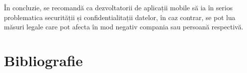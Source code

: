 \documentclass[12pt]{article}
\begin{document}
\bigskip

În concluzie, se recomandă ca dezvoltatorii de aplicații mobile să ia în serios
problematica securității și confidentialitații datelor, în caz contrar, se pot
lua măsuri legale care pot afecta în mod negativ compania sau persoană respectivă.

\newpage
\section{Bibliografie}
\nocite{owasp-top10-2017}
\nocite{owasp-top10-mobile}
\nocite{3ways-auth}

\nocite{liu2016follow}
\nocite{ssidloc}
\nocite{googleperm}
\nocite{redditcalc}

\nocite{rfc-7519}
\nocite{jwt}
\nocite{enisa-2017}
\nocite{enisa-security-data-processing}
\nocite{goldberg1998comparison}
\nocite{felt2017measuring}
\nocite{fette2011websocket}
\nocite{erkkila2012websocket}
\nocite{test-ws}

\nocite{katz1996handbook}
\nocite{tutrsa}
\nocite{jonsson2003public}

\nocite{kahn2010mobile}
\nocite{barton2012regulation}

\nocite{mvvmpng}

\nocite{masse2011rest}
\nocite{tilkov2010node}
\nocite{reqpersec}

\nocite{banker2011mongodb}
\nocite{nayak2013type}


\nocite{jetpackpng}
\nocite{statcounter}
\nocite{moskala2017android}
\nocite{kotlinvsjava}

\printbibliography[title=Bibliografie]
\end{document}
